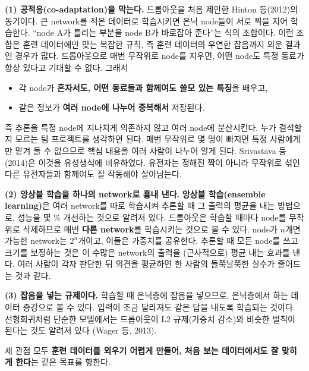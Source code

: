 \documentclass[11pt,a4paper]{article}
\begin{document}
\begin{thinkbox}
\textbf{(1) 공적응(co-adaptation)을 막는다.}
드롭아웃을 처음 제안한 Hinton 등(2012)의 동기이다.
큰 network를 적은 데이터로 학습시키면 은닉 node들이 서로 짝을 지어 학습한다.
``node A가 틀리는 부분을 node B가 바로잡아 준다''는 식의 조합이다.
이런 조합은 훈련 데이터에만 맞는 복잡한 규칙, 즉 훈련 데이터의 우연한 잡음까지 외운 결과인 경우가 많다.
드롭아웃으로 매번 무작위로 node를 지우면, 어떤 node도 특정 동료가 항상 있다고 기대할 수 없다. 그래서
\begin{itemize}[leftmargin=1.5em]
\item 각 node가 \textbf{혼자서도, 어떤 동료들과 함께여도 쓸모 있는 특징}을 배우고,
\item 같은 정보가 \textbf{여러 node에 나누어 중복해서} 저장된다.
\end{itemize}
즉 추론을 특정 node에 지나치게 의존하지 않고 여러 node에 분산시킨다.
누가 결석할지 모르는 팀 프로젝트를 생각하면 된다. 매번 무작위로 몇 명이 빠지면
특정 사람에게만 맡겨 둘 수 없으므로 핵심 내용을 여러 사람이 나누어 알게 된다.
Srivastava 등(2014)은 이것을 유성생식에 비유하였다. 유전자는 정해진 짝이 아니라
무작위로 섞인 다른 유전자들과 함께여도 잘 작동해야 살아남는다.

\medskip
\textbf{(2) 앙상블 학습을 하나의 network로 흉내 낸다.}
\textbf{앙상블 학습(ensemble learning)}은 여러 network를 따로 학습시켜 추론할 때 그 출력의 평균을 내는 방법으로,
성능을 몇 \% 개선하는 것으로 알려져 있다.
드롭아웃은 학습할 때마다 node를 무작위로 삭제하므로 매번 \textbf{다른 network}를 학습시키는 것으로 볼 수 있다.
node가 $n$개면 가능한 network는 $2^n$개이고, 이들은 가중치를 공유한다.
추론할 때 모든 node를 쓰고 크기를 보정하는 것은 이 수많은 network의 출력을 (근사적으로) 평균 내는 효과를 낸다.
여러 사람이 각자 판단한 뒤 의견을 평균하면 한 사람의 들쭉날쭉한 실수가 줄어드는 것과 같다.

\medskip
\textbf{(3) 잡음을 넣는 규제이다.}
학습할 때 은닉층에 잡음을 넣으므로, 은닉층에서 하는 데이터 증강으로 볼 수 있다.
입력이 조금 달라져도 같은 답을 내도록 학습되는 것이다.
선형회귀처럼 단순한 모델에서는 드롭아웃이 L2 규제(가중치 감소)와 비슷한 벌칙이 된다는 것도 알려져 있다 (Wager 등, 2013).

\medskip
세 관점 모두 \textbf{훈련 데이터를 외우기 어렵게 만들어, 처음 보는 데이터에서도 잘 맞히게 한다}는 같은 목표를 향한다.
\end{thinkbox}
\end{document}
